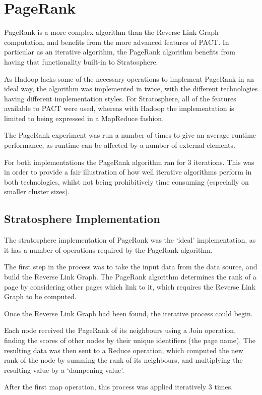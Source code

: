 \section{PageRank}
PageRank is a more complex algorithm than the Reverse Link Graph computation, and benefits from the more advanced features of PACT. In particular as an iterative algorithm, the PageRank algorithm benefits from having that functionality built-in to Stratosphere. 

As Hadoop lacks some of the necessary operations to implement PageRank in an ideal way, the algorithm was implemented in twice, with the different technologies having different implementation styles. For Stratosphere, all of the features available to PACT were used, whereas with Hadoop the implementation is limited to being expressed in a MapReduce fashion.

The PageRank experiment was run a number of times to give an average runtime performance, as runtime can be affected by a number of external elements. 

For both implementations the PageRank algorithm ran for 3 iterations. This was in order to provide a fair illustration of how well iterative algorithms perform in both technologies, whilst not being prohibitively time consuming (especially on smaller cluster sizes).

\subsection{Stratosphere Implementation}
The stratosphere implementation of PageRank was the `ideal' implementation, as it has a number of operations required by the PageRank algorithm. 

The first step in the process was to take the input data from the data source, and build the Reverse Link Graph. The PageRank algorithm determines the rank of a page by considering other pages which link to it, which requires the Reverse Link Graph to be computed. 

Once the Reverse Link Graph had been found, the iterative process could begin.

Each node received the PageRank of its neighbours using a Join operation, finding the scores of other nodes by their unique identifiers (the page name). The resulting data was then sent to a Reduce operation, which computed the new rank of the node by summing the rank of its neighbours, and multiplying the resulting value by a `dampening value'. 

After the first map operation, this process was applied iteratively 3 times. 

